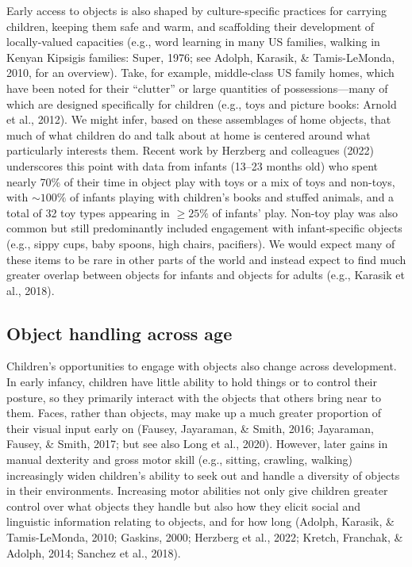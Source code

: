 \documentclass[10pt, letterpaper]{article}
\begin{document}
Early access to objects is also shaped by culture-specific practices for
carrying children, keeping them safe and warm, and scaffolding their
development of locally-valued capacities (e.g., word learning in many US
families, walking in Kenyan Kipsigis families: Super, 1976; see Adolph,
Karasik, \& Tamis-LeMonda, 2010, for an overview). Take, for example,
middle-class US family homes, which have been noted for their
``clutter'' or large quantities of possessions---many of which are
designed specifically for children (e.g., toys and picture books: Arnold
et al., 2012). We might infer, based on these assemblages of home
objects, that much of what children do and talk about at home is
centered around what particularly interests them. Recent work by
Herzberg and colleagues (2022) underscores this point with data from
infants (13--23 months old) who spent nearly 70\% of their time in
object play with toys or a mix of toys and non-toys, with
\({\sim}100\%\) of infants playing with children's books and stuffed
animals, and a total of 32 toy types appearing in \({\ge}25\%\) of
infants' play. Non-toy play was also common but still predominantly
included engagement with infant-specific objects (e.g., sippy cups, baby
spoons, high chairs, pacifiers). We would expect many of these items to
be rare in other parts of the world and instead expect to find much
greater overlap between objects for infants and objects for adults
(e.g., Karasik et al., 2018).

\hypertarget{object-handling-across-age}{%
\subsection{Object handling across
age}\label{object-handling-across-age}}

Children's opportunities to engage with objects also change across
development. In early infancy, children have little ability to hold
things or to control their posture, so they primarily interact with the
objects that others bring near to them. Faces, rather than objects, may
make up a much greater proportion of their visual input early on
(Fausey, Jayaraman, \& Smith, 2016; Jayaraman, Fausey, \& Smith, 2017;
but see also Long et al., 2020). However, later gains in manual
dexterity and gross motor skill (e.g., sitting, crawling, walking)
increasingly widen children's ability to seek out and handle a diversity
of objects in their environments. Increasing motor abilities not only
give children greater control over what objects they handle but also how
they elicit social and linguistic information relating to objects, and
for how long (Adolph, Karasik, \& Tamis-LeMonda, 2010; Gaskins, 2000;
Herzberg et al., 2022; Kretch, Franchak, \& Adolph, 2014; Sanchez et
al., 2018).
\end{document}

